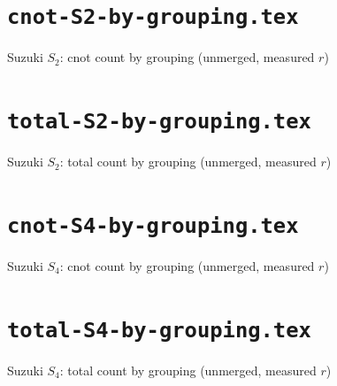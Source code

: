 \documentclass{article}
\begin{document}
\section*{\texttt{cnot-S2-by-grouping.tex}}
Suzuki $S_2$: cnot count by grouping (unmerged, measured $r$)\par\medskip

\clearpage

\section*{\texttt{total-S2-by-grouping.tex}}
Suzuki $S_2$: total count by grouping (unmerged, measured $r$)\par\medskip

\clearpage

\section*{\texttt{cnot-S4-by-grouping.tex}}
Suzuki $S_4$: cnot count by grouping (unmerged, measured $r$)\par\medskip

\clearpage

\section*{\texttt{total-S4-by-grouping.tex}}
Suzuki $S_4$: total count by grouping (unmerged, measured $r$)\par\medskip

\clearpage
\end{document}
